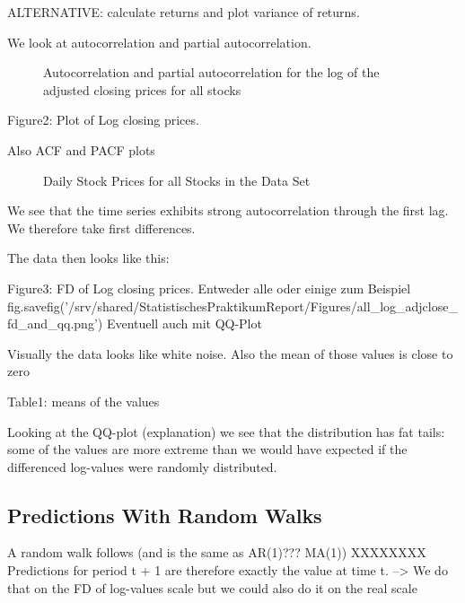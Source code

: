 ALTERNATIVE: calculate returns and plot variance of returns. 

We look at autocorrelation and partial autocorrelation. 
\begin{figure}[h]
    \centering
    \begin{adjustbox}{width=.9\textwidth,center}
    
    \end{adjustbox}  
    \caption{Autocorrelation and partial autocorrelation for the log of the adjusted closing prices for all stocks}
    \label{fig:acf_pacf_log_adjclose}
\end{figure}{}






Figure2: Plot of Log closing prices.
%

Also ACF and PACF plots
\begin{figure}[h]
    \centering
    \begin{adjustbox}{width=.9\textwidth,center}
    
    \end{adjustbox}  
    \caption{Daily Stock Prices for all Stocks in the Data Set}
    \label{fig:adj_close_all}
\end{figure}{}







We see that the time series exhibits strong autocorrelation through the first lag. We therefore take first differences. 

The data then looks like this: 



Figure3: FD of Log closing prices. Entweder alle oder einige zum Beispiel
fig.savefig('/srv/shared/StatistischesPraktikumReport/Figures/all_log_adjclose_fd_and_qq.png')
Eventuell auch mit QQ-Plot

Visually the data looks like white noise. Also the mean of those values is close to zero

Table1: means of the values

Looking at the QQ-plot (explanation) we see that the distribution has fat tails: some of the values are more extreme than we would have expected if the differenced log-values were randomly distributed. 


\subsection{Predictions With Random Walks}
A random walk follows (and is the same as AR(1)??? MA(1))
XXXXXXXX
Predictions for period t + 1 are therefore exactly the value at time t. --> We do that on the FD of log-values scale but we could also do it on the real scale


